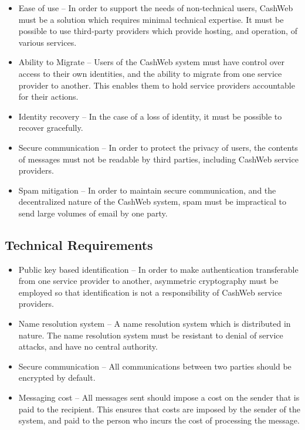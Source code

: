 \documentclass{article}
\theoremstyle{definition}
\begin{document}
\begin{itemize}
\item Ease of use -- 
In order to support the needs of non-technical users, CashWeb must be a solution which requires minimal technical expertise. It must be possible to use third-party providers which provide hosting, and operation, of various services.
\item Ability to Migrate -- 
Users of the CashWeb system must have control over access to their own identities, and the ability to migrate from one service provider to another. This enables them to hold service providers accountable for their actions.
\item Identity recovery -- In the case of a loss of identity, it must be possible to recover gracefully.
\item Secure communication -- In order to protect the privacy of users, the contents of messages must not be readable by third parties, including CashWeb service providers.
\item Spam mitigation -- In order to maintain secure communication, and the decentralized nature of the CashWeb system, spam must be impractical to send large volumes of email by one party.
\end{itemize}

\subsection{Technical Requirements}

\begin{itemize}
\item Public key based identification -- In order to make authentication transferable from one service provider to another, asymmetric cryptography must be employed so that identification is not a responsibility of CashWeb service providers.
\item Name resolution system -- A name resolution system which is distributed in nature. The name resolution system must be resistant to denial of service attacks, and have no central authority.
\item Secure communication -- All communications between two parties should be encrypted by default.
\item Messaging cost -- All messages sent should impose a cost on the sender that is paid to the recipient. This ensures that costs are imposed by the sender of the system, and paid to the person who incurs the cost of processing the message.
\end{itemize}
\end{document}

